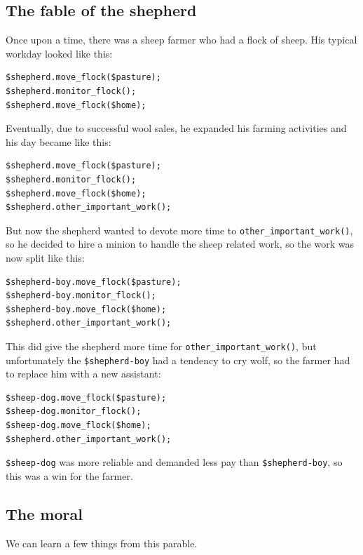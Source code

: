 \subsection{The fable of the shepherd} 

Once upon a time, there was a sheep farmer who had a 
flock of sheep. His typical workday looked like this:

\begin{verbatim}
$shepherd.move_flock($pasture);
$shepherd.monitor_flock();
$shepherd.move_flock($home);
\end{verbatim}

Eventually, due to successful wool sales, he expanded 
his farming activities and his day became like this:

\begin{verbatim}
$shepherd.move_flock($pasture);
$shepherd.monitor_flock();
$shepherd.move_flock($home);
$shepherd.other_important_work();
\end{verbatim}

But now the shepherd wanted to devote more time to 
\verb'other_important_work()', so he decided to hire 
a minion to handle the sheep related work, so the 
work was now split like this:

\begin{verbatim}
$shepherd-boy.move_flock($pasture);
$shepherd-boy.monitor_flock();
$shepherd-boy.move_flock($home);
$shepherd.other_important_work();
\end{verbatim}

This did give the shepherd more time for 
\verb'other_important_work()', but unfortunately the 
\verb'$shepherd-boy' had a tendency to cry wolf, so 
the farmer had to replace him with a new assistant:

\begin{verbatim}
$sheep-dog.move_flock($pasture);
$sheep-dog.monitor_flock();
$sheep-dog.move_flock($home);
$shepherd.other_important_work();
\end{verbatim}

\verb'$sheep-dog' was more reliable and demanded 
less pay than \verb'$shepherd-boy', so this was 
a win for the farmer.

\subsection{The moral}

We can learn a few things from this parable.

